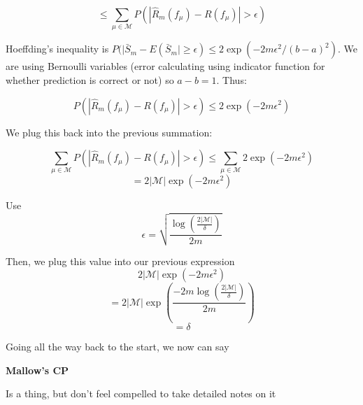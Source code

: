 \documentclass{article}
\begin{document}
$$
\leq \sum_{\mu \in \mathcal{M}} P(|\hat{R}_m(f_\mu) -  R(f_\mu)| > \epsilon)
$$

Hoeffding's inequality is $P(|\bar{S}_m - E(\bar{S}_m| \geq \epsilon) \leq 2
\exp (-2m\epsilon^2 / (b-a)^2)$. We are using Bernoulli variables (error
calculating using indicator function for whether prediction is correct or not)
so $a-b=1$. Thus:

$$
P(|\hat{R}_m(f_\mu) -  R(f_\mu)| > \epsilon) \leq 2 \exp (-2m\epsilon^2)
$$

We plug this back into the previous summation:

$$
\sum_{\mu \in \mathcal{M}} P(|\hat{R}_m(f_\mu) -  R(f_\mu)| > \epsilon) \leq  \sum_{\mu \in \mathcal{M}} 2 \exp (-2m\epsilon^2)
$$
$$
=2|\mathcal{M}|\exp(-2m\epsilon^2)
$$

Use  
$$\epsilon = \sqrt{\frac{\log \left( \frac{2|\mathcal{M}|}{\delta}\right)}{2m}} $$

Then, we plug this value into our previous expression
$$
2|\mathcal{M}|\exp(-2m\epsilon^2)
$$
$$
= 2 |\mathcal{M}|\exp \left( \frac{-2m \log \left( \frac{2|\mathcal{M}|}{\delta}\right)}{2m}
\right)
$$
$$
= \delta
$$

Going all the way back to the start, we now can say

\bigskip

\textbf{Mallow's CP}

Is a thing, but don't feel compelled to take detailed notes on it
\end{document}
